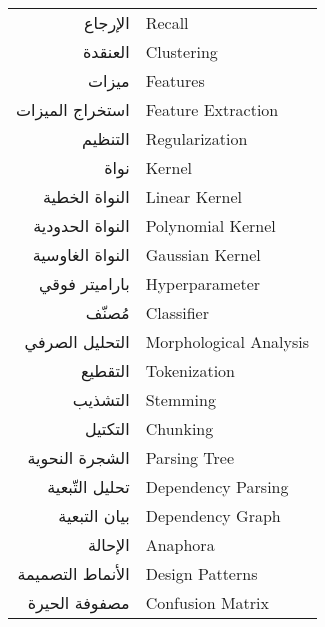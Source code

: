 \begin{doublespacing}
\begin{center}
\begin{longtable}{r l}
			الإرجاع			& 			\textenglish{Recall}				\\
			
			
			العنقدة			& 			\textenglish{Clustering}				\\
			
			
			ميزات			& 				\textenglish{Features}				\\
			
			
			استخراج الميزات		& 				\textenglish{Feature Extraction}				\\
			
			
			التنظيم		& 			\textenglish{Regularization}	\\
			
			
			نواة		& 			\textenglish{Kernel}	\\
			
			النواة الخطية		& 			\textenglish{Linear Kernel}		\\
			
			النواة الحدودية		& 			\textenglish{Polynomial Kernel}		\\
			
			النواة الغاوسية		& 			\textenglish{Gaussian Kernel}		\\
			
			باراميتر فوقي		& 			\textenglish{Hyperparameter}		\\
			
			مُصنّف	& 			\textenglish{Classifier}		\\
			
			التحليل الصرفي	& 			\textenglish{Morphological Analysis}		\\
			
			التقطيع		& 			\textenglish{Tokenization}		\\
			
			التشذيب	& 			\textenglish{Stemming}		\\
			
			التكتيل		& 			\textenglish{Chunking}		\\
			
			الشجرة النحوية		& 			\textenglish{Parsing Tree}		\\
			
			تحليل التّبعية		& 			\textenglish{Dependency Parsing}		\\
			
			بيان التبعية		& 			\textenglish{Dependency Graph}		\\
			
			الإحالة		& 			\textenglish{Anaphora}		\\
			
			الأنماط التصميمة		& 			\textenglish{Design Patterns}		\\
			
			مصفوفة الحيرة		& 			\textenglish{Confusion Matrix}		\\
			
		\end{longtable}
	\end{center}
\end{doublespacing}

